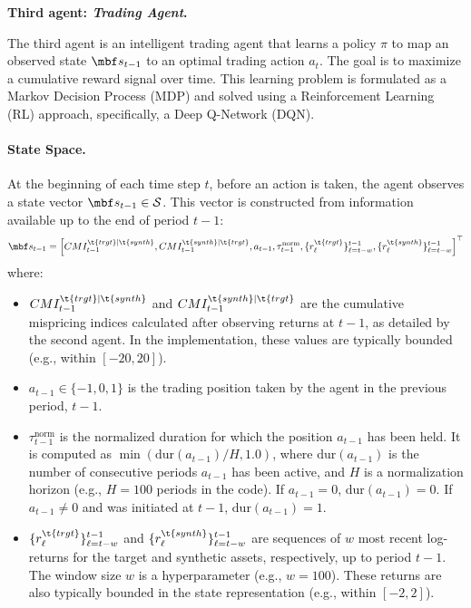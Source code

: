 \documentclass[12pt,a4paper]{article}
\begin{document}

\bx
\textbf{Third agent: \textit{Trading Agent}.}

The third agent is an intelligent trading agent that learns a policy $\pi$ to map an observed state $\mbf s_{t-1}$ to an optimal trading action $a_t$. The goal is to maximize a cumulative reward signal over time. This learning problem is formulated as a Markov Decision Process (MDP) and solved using a Reinforcement Learning (RL) approach, specifically, a Deep Q-Network (DQN).

\paragraph{State Space.}
At the beginning of each time step $t$, before an action is taken, the agent observes a state vector $\mbf s_{t-1} \in \mathcal{S}$. This vector is constructed from information available up to the end of period $t-1$:
%
\[
\mbf s_{t-1}=
\left[
CMI_{t-1}^{{\t{trgt}}|{\t{synth}}},
CMI_{t-1}^{{\t{synth}}|{\t{trgt}}},
a_{t-1},
\tau_{t-1}^{\text{norm}},
\{r^{\t{trgt}}_\ell\}_{\ell=t-w}^{t-1},
\{r^{\t{synth}}_\ell\}_{\ell=t-w}^{t-1}
\right]^{\top}
\]
%
where:
\begin{itemize}
    \item $CMI_{t-1}^{{\t{trgt}}|{\t{synth}}}$ and $CMI_{t-1}^{{\t{synth}}|{\t{trgt}}}$ are the cumulative mispricing indices calculated after observing returns at $t-1$, as detailed by the second agent. In the implementation, these values are typically bounded (e.g., within $[-20, 20]$).
    \item $a_{t-1} \in \{-1, 0, 1\}$ is the trading position taken by the agent in the previous period, $t-1$.
    \item $\tau_{t-1}^{\text{norm}}$ is the normalized duration for which the position $a_{t-1}$ has been held. It is computed as $\min(\text{dur}(a_{t-1}) / H, 1.0)$, where $\text{dur}(a_{t-1})$ is the number of consecutive periods $a_{t-1}$ has been active, and $H$ is a normalization horizon (e.g., $H=100$ periods in the code). If $a_{t-1}=0$, $\text{dur}(a_{t-1})=0$. If $a_{t-1} \neq 0$ and was initiated at $t-1$, $\text{dur}(a_{t-1})=1$.
    \item $\{r^{\t{trgt}}_\ell\}_{\ell=t-w}^{t-1}$ and $\{r^{\t{synth}}_\ell\}_{\ell=t-w}^{t-1}$ are sequences of $w$ most recent log-returns for the target and synthetic assets, respectively, up to period $t-1$. The window size $w$ is a hyperparameter (e.g., $w=100$). These returns are also typically bounded in the state representation (e.g., within $[-2, 2]$).
\end{itemize}
\end{document}
